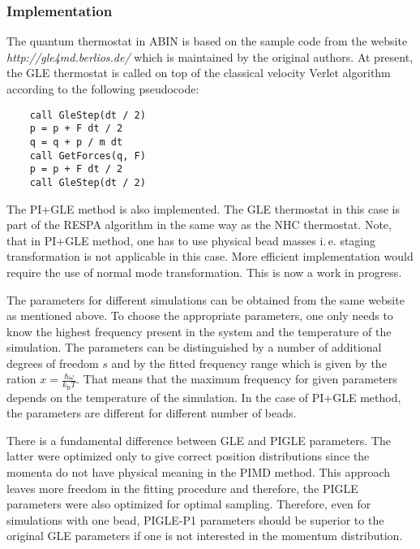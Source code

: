 \subsubsection{Implementation}
\label{sGLEimpl}
The quantum thermostat in \textsc{ABIN} is based on the sample code from the website \textit{http://gle4md.berlios.de/} which is maintained by the original authors.
At present, the GLE thermostat is called on top of the classical velocity Verlet algorithm according to the following pseudocode:

\bigskip
\begin{verbatim}
    call GleStep(dt / 2)
    p = p + F dt / 2
    q = q + p / m dt
    call GetForces(q, F) 
    p = p + F dt / 2
    call GleStep(dt / 2)
\end{verbatim}
\bigskip

The PI+GLE method is also implemented. The GLE thermostat in this case is part of the RESPA algorithm in the same way as the NHC thermostat. Note, that in PI+GLE method, one has to use physical bead masses i.\,e. staging transformation is not applicable in this case\cite{Ceriotti2012}. More efficient implementation would require the use of normal mode transformation. This is now a work in progress.

The parameters for different simulations can be obtained from the same website as mentioned above. To choose the appropriate parameters, one only needs to know the highest frequency present in the system and the temperature of the simulation. The parameters can be distinguished by a number of additional degrees of freedom $s$ and by the fitted frequency range which is given by the ration $x=\frac{\hbar\omega}{k_\mathrm{B}T}$. That means that the maximum frequency for given parameters depends on the temperature of the simulation. In the case of PI+GLE method, the parameters are different for different number of beads.

There is a fundamental difference between GLE and PIGLE parameters. The latter were optimized only to give correct position distributions since the momenta do not have physical meaning in the PIMD method. This approach leaves more freedom in the fitting procedure and therefore, the PIGLE parameters were also optimized for optimal sampling. Therefore, even for simulations with one bead, PIGLE-P1 parameters should be superior to the original GLE parameters if one is not interested in the momentum distribution. 


